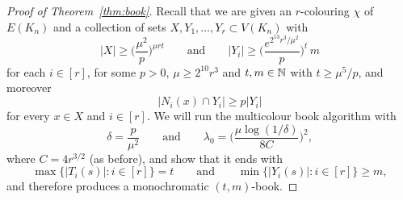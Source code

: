 \begin{proof}[Proof of Theorem~\ref{thm:book}]
Recall that we are given an $r$-colouring $\chi$ of $E(K_n)$ and a collection of %
sets $X,Y_1,\ldots,Y_r \subset V(K_n)$ with
\begin{equation}\label{eq:book:thm:conditions}
|X| \ge \bigg( \frac{\mu^2}{p} \bigg)^{\mu r t} \qquad \text{and} \qquad |Y_i| \ge \bigg( \frac{e^{2^{13} r^3 / \mu^2}}{p} \bigg)^t \, m
\end{equation}
for each $i \in [r]$, for some $p > 0$, $\mu \ge 2^{10} r^3$ and $t,m \in \mathbb{N}$ with $t \ge \mu^5 / p$, and moreover
\begin{equation}\label{eq:book:thm:min:degree}
|N_i(x) \cap Y_i| \ge p|Y_i|
\end{equation}
for every $x \in X$ and $i \in [r]$. 
We will run the multicolour book algorithm with
$$\delta = \frac{p}{\mu^2} \qquad \text{and} \qquad \lambda_0 = \bigg( \frac{\mu \log(1/\delta)}{8C} \bigg)^2,$$
where $C = 4r^{3/2}$ (as before), and show that it ends with
$$\max \big\{ |T_i(s)| : i \in [r] \big\} = t \qquad \text{and} \qquad \min\big\{ |Y_i(s)| : i \in [r] \big\} \ge m,$$
and therefore produces a monochromatic $(t,m)$-book.


\end{proof}
